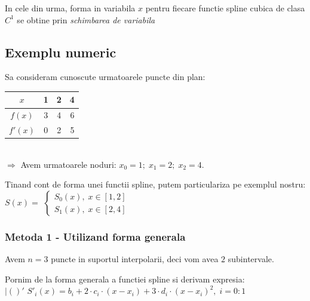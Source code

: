 \documentclass{article}
\begin{document}
In cele din urma, forma in variabila $x$ pentru fiecare functie spline cubica de clasa $C^1$ se obtine prin \textit{schimbarea de variabila} 

\subsection{Exemplu numeric}
\tab Sa consideram cunoscute urmatoarele puncte din plan:
\begin{tabular}{c | c | c | c}
    $x$ & 1 & 2 & 4 \\
    \hline
    $f(x)$ & 3 & 4 & 6 \\
    \hline
    $f'(x)$ & 0 & 2 & 5 \\
\end{tabular}\\

$\Rightarrow$ Avem urmatoarele noduri: $x_0=1;\; x_1=2;\; x_2=4$.

Tinand cont de forma unei functii spline, putem particulariza pe exemplul nostru: $S(x) = $
$\begin{cases}
  S_0(x),\; x \in [1, 2] \\
  S_1(x),\; x \in [2, 4]
\end{cases}$

\subsubsection{Metoda 1 - Utilizand forma generala}
\tab Avem $n = 3$ puncte in suportul interpolarii, deci vom avea $2$ subintervale.

Pornim de la forma generala a functiei spline si derivam expresia:\\

 $|()'$ \vspace{0.1cm}
\tabto{0.5cm} $S'_i(x) = b_i + 2 \cdot c_i \cdot (x-x_i) + 3 \cdot d_i \cdot (x-x_i)^2,\; i = 0 : 1$\\
\end{document}

